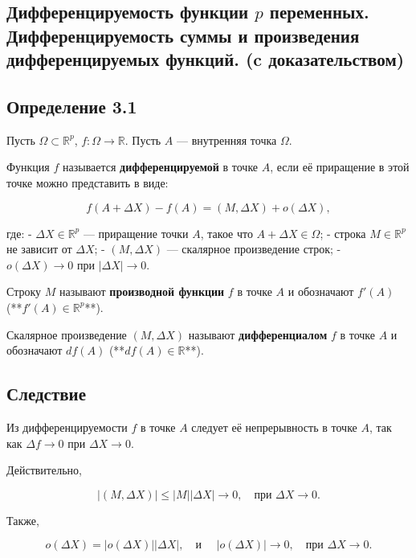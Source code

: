 {
\subsection{Дифференцируемость функции \(p\) переменных. Дифференцируемость суммы и произведения дифференцируемых функций. (c доказательством)}
\subsection*{Определение 3.1}

Пусть \( \Omega \subset \mathbb{R}^p \), \( f: \Omega \to \mathbb{R} \). Пусть \( A \) — внутренняя точка \( \Omega \).

Функция \( f \) называется \textbf{дифференцируемой} в точке \( A \), если её приращение в этой точке можно представить в виде:



\[
f(A + \Delta X) - f(A) = (M, \Delta X) + o(\Delta X),
\]



где:  
- \( \Delta X \in \mathbb{R}^p \) — приращение точки \( A \), такое что \( A + \Delta X \in \Omega \);  
- строка \( M \in \mathbb{R}^p \) не зависит от \( \Delta X \);  
- \( (M, \Delta X) \) — скалярное произведение строк;  
- \( o(\Delta X) \to 0 \) при \( |\Delta X| \to 0 \).  

Строку \( M \) называют \textbf{производной функции} \( f \) в точке \( A \) и обозначают \( f'(A) \) (**\( f'(A) \in \mathbb{R}^p \)**).  

Скалярное произведение \( (M, \Delta X) \) называют \textbf{дифференциалом} \( f \) в точке \( A \) и обозначают \( df(A) \) (**\( df(A) \in \mathbb{R} \)**).  

\subsection*{Следствие}

Из дифференцируемости \( f \) в точке \( A \) следует её непрерывность в точке \( A \), так как \( \Delta f \to 0 \) при \( \Delta X \to 0 \).  

Действительно,  


\[
|(M, \Delta X)| \leq |M| |\Delta X| \to 0, \quad \text{при } \Delta X \to 0.
\]

  
Также,  


\[
o(\Delta X) = |o(\Delta X)| |\Delta X|, \quad \text{и } \quad |o(\Delta X)| \to 0, \quad \text{при } \Delta X \to 0.
\]

  

}
